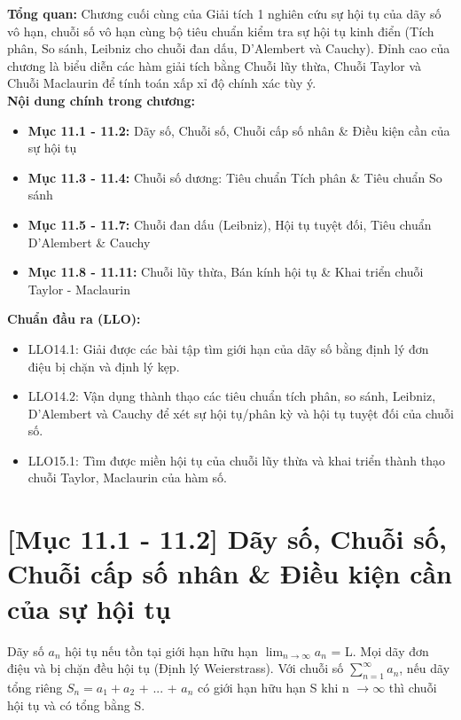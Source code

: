\documentclass[11pt,a4paper,oneside]{book}
\begin{document}
\begin{tcolorbox}[colback=slate!5!white,colframe=slate!75!black,title={\textbf{Mục lục Chương 11 \& Chuẩn đầu ra (Buổi 14 - 15)}}]
\textbf{Tổng quan:} Chương cuối cùng của Giải tích 1 nghiên cứu sự hội tụ của dãy số vô hạn, chuỗi số vô hạn cùng bộ tiêu chuẩn kiểm tra sự hội tụ kinh điển (Tích phân, So sánh, Leibniz cho chuỗi đan dấu, D'Alembert và Cauchy). Đỉnh cao của chương là biểu diễn các hàm giải tích bằng Chuỗi lũy thừa, Chuỗi Taylor và Chuỗi Maclaurin để tính toán xấp xỉ độ chính xác tùy ý.\\[6pt]
\textbf{Nội dung chính trong chương:}
\begin{itemize}[leftmargin=1.5em, itemsep=2pt]
  \item \textbf{Mục 11.1 - 11.2:} Dãy số, Chuỗi số, Chuỗi cấp số nhân \& Điều kiện cần của sự hội tụ
  \item \textbf{Mục 11.3 - 11.4:} Chuỗi số dương: Tiêu chuẩn Tích phân \& Tiêu chuẩn So sánh
  \item \textbf{Mục 11.5 - 11.7:} Chuỗi đan dấu (Leibniz), Hội tụ tuyệt đối, Tiêu chuẩn D'Alembert \& Cauchy
  \item \textbf{Mục 11.8 - 11.11:} Chuỗi lũy thừa, Bán kính hội tụ \& Khai triển chuỗi Taylor - Maclaurin
\end{itemize}
\textbf{Chuẩn đầu ra (LLO):}
\begin{itemize}[leftmargin=1.5em, itemsep=2pt]
  \item LLO14.1: Giải được các bài tập tìm giới hạn của dãy số bằng định lý đơn điệu bị chặn và định lý kẹp.
  \item LLO14.2: Vận dụng thành thạo các tiêu chuẩn tích phân, so sánh, Leibniz, D'Alembert và Cauchy để xét sự hội tụ/phân kỳ và hội tụ tuyệt đối của chuỗi số.
  \item LLO15.1: Tìm được miền hội tụ của chuỗi lũy thừa và khai triển thành thạo chuỗi Taylor, Maclaurin của hàm số.
\end{itemize}
\end{tcolorbox}

\section{[Mục 11.1 - 11.2] Dãy số, Chuỗi số, Chuỗi cấp số nhân \& Điều kiện cần của sự hội tụ}
Dãy số {$a_n$} hội tụ nếu tồn tại giới hạn hữu hạn $\lim_{n\to \infty} a_n$ = L. Mọi dãy đơn điệu và bị chặn đều hội tụ (Định lý Weierstrass). Với chuỗi số $\sum_{n=1}^\infty a_n$, nếu dãy tổng riêng $S_n = a_1 + a_2$ + ... + $a_n$ có giới hạn hữu hạn S khi n $\to \infty$ thì chuỗi hội tụ và có tổng bằng S.
\end{document}
